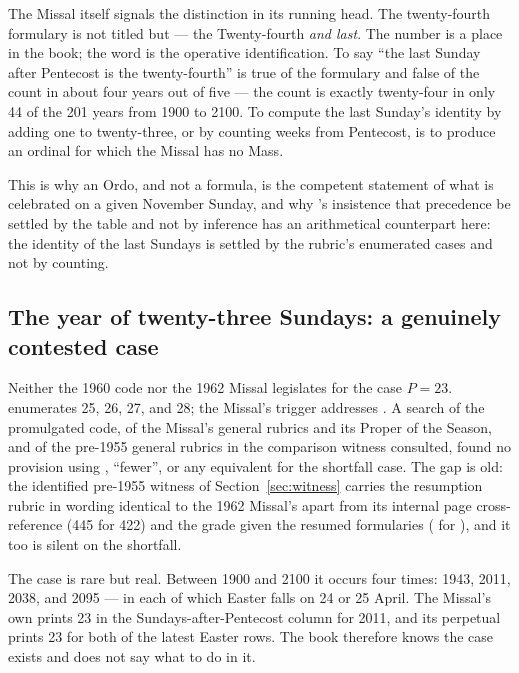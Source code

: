 The Missal itself signals the distinction in its running head. The twenty-fourth formulary is
not titled  but  — the Twenty-fourth \emph{and last}. The number is a place in the book; the word
 is the operative identification. To say ``the last Sunday after Pentecost is the
twenty-fourth'' is true of the formulary and false of the count in about four years out of
five — the count is exactly twenty-four in only 44 of the 201 years from 1900 to 2100. To
compute the last Sunday's identity by adding one to twenty-three, or by counting weeks from
Pentecost, is to produce an ordinal for which the Missal has no Mass.

This is why an Ordo, and not a formula, is the competent statement of what is celebrated on a
given November Sunday, and why 's insistence that precedence be settled by the table and
not by inference has an arithmetical counterpart here: the identity of the last Sundays is
settled by the rubric's enumerated cases and not by counting.

\subsection{The year of twenty-three Sundays: a genuinely contested case}

Neither the 1960 code nor the 1962 Missal legislates for the case $P = 23$.  enumerates
25, 26, 27, and 28; the Missal's trigger addresses . A search of the
promulgated code, of the Missal's general rubrics and its Proper of the Season, and of the
pre-1955 general rubrics in the comparison witness consulted, found no provision using
, ``fewer'', or any equivalent for the shortfall case. The gap is old: the
identified pre-1955 witness of Section~\ref{sec:witness} carries the resumption rubric in wording
identical to the 1962 Missal's apart from its internal page cross-reference (445 for 422) and the
grade given the resumed formularies ( for ), and it too is
silent on the shortfall.

The case is rare but real. Between 1900 and 2100 it occurs four times: 1943, 2011, 2038, and
2095 — in each of which Easter falls on 24 or 25 April. The Missal's own  prints 23 in the Sundays-after-Pentecost column for 2011, and its perpetual
 prints 23 for both of the latest Easter rows. The
book therefore knows the case exists and does not say what to do in it.

